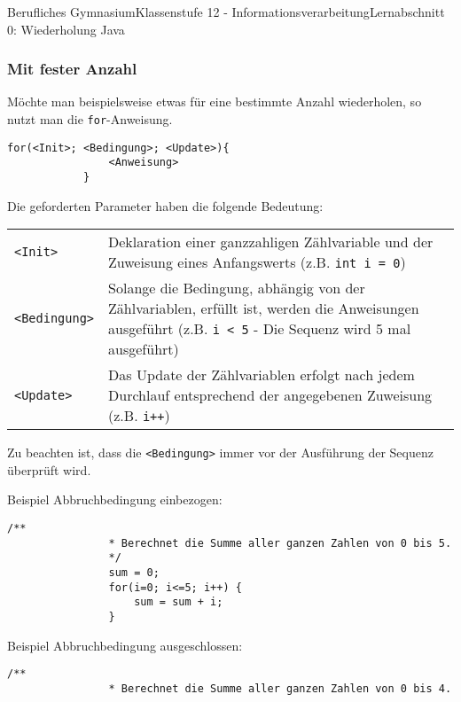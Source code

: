 \documentclass[11pt,oneside,openany,headings=optiontotoc,11pt,numbers=noenddot]{article}
\begin{document}
\begin{worksheet}{Berufliches Gymnasium}{Klassenstufe 12 - Informationsverarbeitung}{Lernabschnitt 0: Wiederholung Java}
		\subsubsection{Mit fester Anzahl}
		Möchte man beispielsweise etwas für eine bestimmte Anzahl wiederholen, so nutzt man die \lstinline[style=JavaInputStyle]|for|-Anweisung.
		\begin{lstlisting}[style=JavaInputStyle]
			for(<Init>; <Bedingung>; <Update>){
				<Anweisung>
			}
		\end{lstlisting}
		\par\bigskip\noindent
		Die geforderten Parameter haben die folgende Bedeutung:\\
		\begin{tabularx}{\textwidth}{lX}
			{\lstinline[style=JavaInputStyle]|<Init>|} & Deklaration einer ganzzahligen Zählvariable und der Zuweisung eines Anfangswerts (z.B. {\lstinline[style=JavaInputStyle]|int i = 0|})\\
			{\lstinline[style=JavaInputStyle]|<Bedingung>|} & Solange die Bedingung, abhängig von der Zählvariablen, erfüllt ist, werden die Anweisungen ausgeführt (z.B. {\lstinline[style=JavaInputStyle]|i < 5|} - Die Sequenz wird 5 mal ausgeführt)\\
			{\lstinline[style=JavaInputStyle]|<Update>|} & Das Update der Zählvariablen erfolgt nach jedem Durchlauf entsprechend der angegebenen Zuweisung (z.B. {\lstinline[style=JavaInputStyle]|i++|})
		\end{tabularx}
		Zu beachten ist, dass die {\lstinline[style=JavaInputStyle]|<Bedingung>|} immer vor der Ausführung der Sequenz überprüft wird.\\
		\par\noindent
		\begin{minipage}[t]{0.48\textwidth}
			\vspace*{0pt}
			Beispiel Abbruchbedingung einbezogen:
			\begin{lstlisting}[style=JavaInputStyle,frame=single]
				/**
				* Berechnet die Summe aller ganzen Zahlen von 0 bis 5.
				*/
				sum = 0;
				for(i=0; i<=5; i++) {
					sum = sum + i;
				}
			\end{lstlisting}
		\end{minipage}
		\hfill
		\begin{minipage}[t]{0.48\textwidth}
			\vspace*{0pt}
			Beispiel Abbruchbedingung ausgeschlossen:
			\begin{lstlisting}[style=JavaInputStyle,frame=single]
				/**
				* Berechnet die Summe aller ganzen Zahlen von 0 bis 4.

\end{lstlisting}
\end{minipage}
\end{worksheet}
\end{document}
